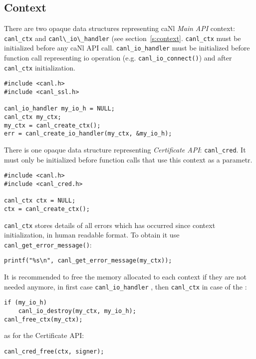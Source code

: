 \subsection{Context}
\label{s:canl_ctx}
%
There are two opaque data structures representing caNl \textit{Main API} 
context: \verb'canl_ctx' and \verb'canl\_io\_handler' (see 
section~\ref{s:context}.
\verb'canl_ctx' must be initialized before any caNl API call.
\verb'canl_io_handler' must be initialized before function call 
representing io operation (e.g. \verb'canl_io_connect()') and after
\verb'canl_ctx' initialization. 
\begin{lstlisting}
#include <canl.h>
#include <canl_ssl.h>

canl_io_handler my_io_h = NULL;
canl_ctx my_ctx;
my_ctx = canl_create_ctx();
err = canl_create_io_handler(my_ctx, &my_io_h);
\end{lstlisting}
There is one opaque data structure representing \CANL 
\textit{Certificate API}: \verb'canl_cred'.
It must only be initialized before function calls
that use this context as a parametr.
\begin{lstlisting}
#include <canl.h>
#include <canl_cred.h>

canl_ctx ctx = NULL;
ctx = canl_create_ctx();
\end{lstlisting}
%
\verb'canl_ctx' stores details of all errors which has occurred since 
context initialization, in human readable format. To obtain it use 
\verb'canl_get_error_message()':
\begin{lstlisting}
printf("%s\n", canl_get_error_message(my_ctx));
\end{lstlisting}

%
It is recommended to free the memory allocated to each 
context if they are not needed anymore, in first case \verb'canl_io_handler'
, then \verb'canl_ctx' in case of the :
\begin{lstlisting}
if (my_io_h)
	canl_io_destroy(my_ctx, my_io_h);
canl_free_ctx(my_ctx);
\end{lstlisting}
as for the Certificate API:
\begin{lstlisting}
canl_cred_free(ctx, signer);
\end{lstlisting}
